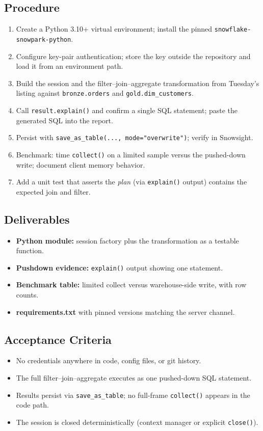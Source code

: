 \subsection*{Procedure}
\begin{enumerate}
    \item Create a Python 3.10+ virtual environment; install the pinned \texttt{snowflake-snowpark-python}.
    \item Configure key-pair authentication; store the key outside the repository and load it from an environment path.
    \item Build the session and the filter--join--aggregate transformation from Tuesday's listing against \texttt{bronze.orders} and \texttt{gold.dim\_customers}.
    \item Call \texttt{result.explain()} and confirm a single SQL statement; paste the generated SQL into the report.
    \item Persist with \texttt{save\_as\_table(..., mode="overwrite")}; verify in Snowsight.
    \item Benchmark: time \texttt{collect()} on a limited sample versus the pushed-down write; document client memory behavior.
    \item Add a unit test that asserts the \emph{plan} (via \texttt{explain()} output) contains the expected join and filter.
\end{enumerate}

\subsection*{Deliverables}
\begin{itemize}
    \item \textbf{Python module:} session factory plus the transformation as a testable function.
    \item \textbf{Pushdown evidence:} \texttt{explain()} output showing one statement.
    \item \textbf{Benchmark table:} limited collect versus warehouse-side write, with row counts.
    \item \textbf{requirements.txt} with pinned versions matching the server channel.
\end{itemize}

\subsection*{Acceptance Criteria}
\begin{itemize}
    \item No credentials anywhere in code, config files, or git history.
    \item The full filter--join--aggregate executes as one pushed-down SQL statement.
    \item Results persist via \texttt{save\_as\_table}; no full-frame \texttt{collect()} appears in the code path.
    \item The session is closed deterministically (context manager or explicit \texttt{close()}).
\end{itemize}

